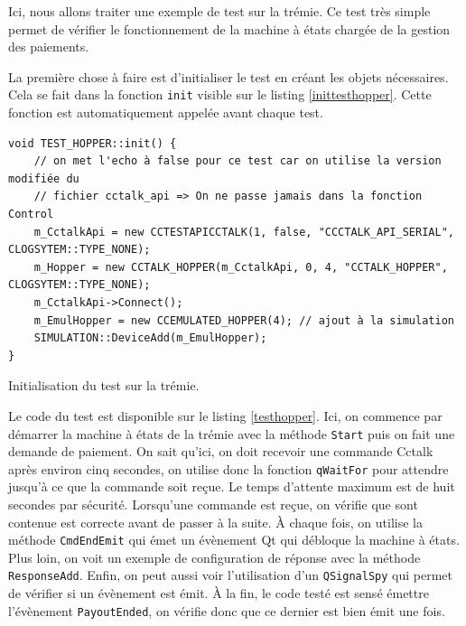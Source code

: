 \documentclass[a4paper]{article}
\begin{document}
Ici, nous allons traiter une exemple de test sur la trémie. Ce test très
simple permet de vérifier le fonctionnement de la machine à états chargée de la
gestion des paiements.

La première chose à faire est d'initialiser le test en créant les objets
nécessaires. Cela se fait dans la fonction \verb|init| visible sur le listing
\ref{inittesthopper}. Cette fonction est automatiquement appelée avant chaque
test.

\begin{listing}[ht!]
\begin{verbatim}
void TEST_HOPPER::init() {
    // on met l'echo à false pour ce test car on utilise la version modifiée du
    // fichier cctalk_api => On ne passe jamais dans la fonction Control
    m_CctalkApi = new CCTESTAPICCTALK(1, false, "CCCTALK_API_SERIAL", CLOGSYTEM::TYPE_NONE);
    m_Hopper = new CCTALK_HOPPER(m_CctalkApi, 0, 4, "CCTALK_HOPPER", CLOGSYTEM::TYPE_NONE);
    m_CctalkApi->Connect();
    m_EmulHopper = new CCEMULATED_HOPPER(4); // ajout à la simulation
    SIMULATION::DeviceAdd(m_EmulHopper);
}
\end{verbatim}
\caption{Initialisation du test sur la trémie.}
\label{inittesthopper}
\end{listing}

Le code du test est disponible sur le listing \ref{testhopper}. Ici, on commence
par démarrer la machine à états de la trémie avec la méthode \verb|Start| puis
on fait une demande de paiement. On sait qu'ici, on doit recevoir une commande
Cctalk après environ cinq secondes, on utilise donc la fonction \verb|qWaitFor|
pour attendre jusqu'à ce que la commande soit reçue. Le temps d'attente maximum
est de huit secondes par sécurité. Lorsqu'une commande est reçue, on vérifie que
sont contenue est correcte avant de passer à la suite. À chaque fois, on utilise
la méthode \verb|CmdEndEmit| qui émet un évènement Qt qui débloque la machine à
états. Plus loin, on voit un exemple de configuration de réponse avec la méthode
\verb|ResponseAdd|. Enfin, on peut aussi voir l'utilisation d'un
\verb|QSignalSpy| qui permet de vérifier si un évènement est émit. À la fin, le
code testé est sensé émettre l'évènement \verb|PayoutEnded|, on vérifie donc que
ce dernier est bien émit une fois.
\end{document}
